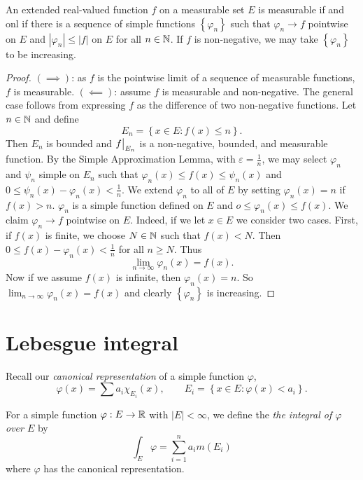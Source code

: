 
\begin{theorem}
	An extended real-valued function $f$ on a measurable set $E$
	is measurable if and onl if there is a sequence of simple functions
	$
		\left\{
			\varphi_n
		\right\}
	$
	such that $\varphi_n \to f$ pointwise on $E$ and
	$\left\lvert \varphi_n \right\rvert \leq \left\lvert f \right\rvert$
	on $E$ for all $n \in \mathbb{N}$.
	If $f$ is non-negative, we may take
	$
		\left\{
			\varphi_n
		\right\}
	$
	to be increasing.
\end{theorem}

\begin{proof}
	$(\implies)$:
	as $f$ is the pointwise limit of a sequence of measurable functions,
	$f$ is measurable.
	$(\impliedby)$:
	assume $f$ is measurable and non-negative.
	The general case follows from expressing $f$ as the difference of two
	non-negative functions.
	Let $n \in \mathbb{N}$ and define
	\[
		E_n = \left\{
			x \in E: f(x) \leq n
		\right\}.
	\]
	Then $E_n$ is bounded and $\restr f{E_n}$ is a non-negative, bounded,
	and measurable function.
	By the Simple Approximation Lemma, with $\varepsilon = \frac1n$,
	we may select $\varphi_n$ and $\psi_n$ simple on $E_n$
	such that $\varphi_n(x) \leq f(x) \leq \psi_n(x)$
	and $0 \leq \psi_n(x) - \varphi_n(x) < \frac1n$.
	We extend $\varphi_n$ to all of $E$ by setting $\varphi_n(x) = n$
	if $f(x) > n$.
	$\varphi_n$ is a simple function defined on $E$ and
	$o \leq \varphi_n(x) \leq f(x)$.
	We claim $\varphi_n \to f$ pointwise on $E$.
	Indeed, if we let $x \in E$ we consider two cases.
	First, if $f(x)$ is finite, we choose $N \in \mathbb{N}$ such that
	$f(x) < N$.
	Then
	$0 \leq f(x) - \varphi_n(x) < \frac1n$
	for all $n \geq N$.
	Thus
	\[
		\lim_{n \to \infty} \varphi_n(x) = f(x).
	\]
	Now if we assume $f(x)$ is infinite, then $\varphi_n(x) = n$.
	So $\lim_{n \to \infty} \varphi_n(x) = f(x)$
	and clearly
	$
		\left\{
			\varphi_n
		\right\}
	$
	is increasing.
\end{proof}

\section{Lebesgue integral}

Recall our \emph{canonical representation} of a simple function $\varphi$,
\[
	\varphi(x) = \sum a_i \chi_{E_i}(x), \qquad
	E_i = \left\{
		x \in E: \varphi(x) < a_i
	\right\}.
\]

\begin{definition}
	For a simple function $\varphi: E \to \mathbb{R}$ with
	$\left\lvert E \right\rvert < \infty$, we define the
	\emph{the integral of $\varphi$ over $E$} by
	\[
		\int_E \varphi =
		\sum_{i=1}^n a_i m(E_i)
	\]
	where $\varphi$ has the canonical representation.
\end{definition}


